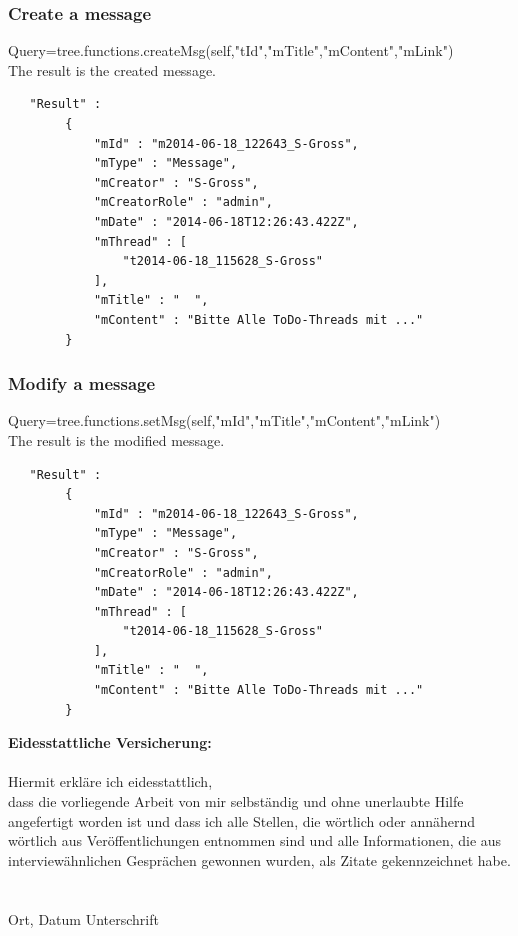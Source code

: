 \documentclass[12pt,a4paper,oneside]{report}
\begin{document}
\subsubsection{Create a message}
Query=tree.functions.createMsg(self,"tId","mTitle","mContent","mLink")\\
The result is the created message.
\begin{lstlisting}
   "Result" :   
        { 
            "mId" : "m2014-06-18_122643_S-Gross",
            "mType" : "Message",
            "mCreator" : "S-Gross",
            "mCreatorRole" : "admin",
            "mDate" : "2014-06-18T12:26:43.422Z",
            "mThread" : [  
                "t2014-06-18_115628_S-Gross"
            ],
            "mTitle" : "  ",
            "mContent" : "Bitte Alle ToDo-Threads mit ..."
        }
\end{lstlisting}

\subsubsection{Modify a message}
Query=tree.functions.setMsg(self,"mId","mTitle","mContent","mLink")\\
The result is the modified message.
\begin{lstlisting}
   "Result" :   
        { 
            "mId" : "m2014-06-18_122643_S-Gross",
            "mType" : "Message",
            "mCreator" : "S-Gross",
            "mCreatorRole" : "admin",
            "mDate" : "2014-06-18T12:26:43.422Z",
            "mThread" : [  
                "t2014-06-18_115628_S-Gross"
            ],
            "mTitle" : "  ",
            "mContent" : "Bitte Alle ToDo-Threads mit ..."
        }
\end{lstlisting}

\printbibliography

\pagebreak 
\textbf{\large Eidesstattliche Versicherung:}\\~\\
Hiermit erkläre ich eidesstattlich,\hfill \break \\
dass die vorliegende Arbeit von mir selbständig und ohne unerlaubte Hilfe angefertigt worden ist und dass ich alle Stellen, die wörtlich oder annähernd wörtlich aus Veröffentlichungen entnommen sind und alle Informationen, die aus interviewähnlichen Gesprächen gewonnen wurden, als Zitate gekennzeichnet habe. \hfill \break
\\
~\\~\\
 
Ort, Datum \underline{\hspace{4cm}} \hspace{1cm}
Unterschrift \underline{\hspace{4cm}}
\end{document}
